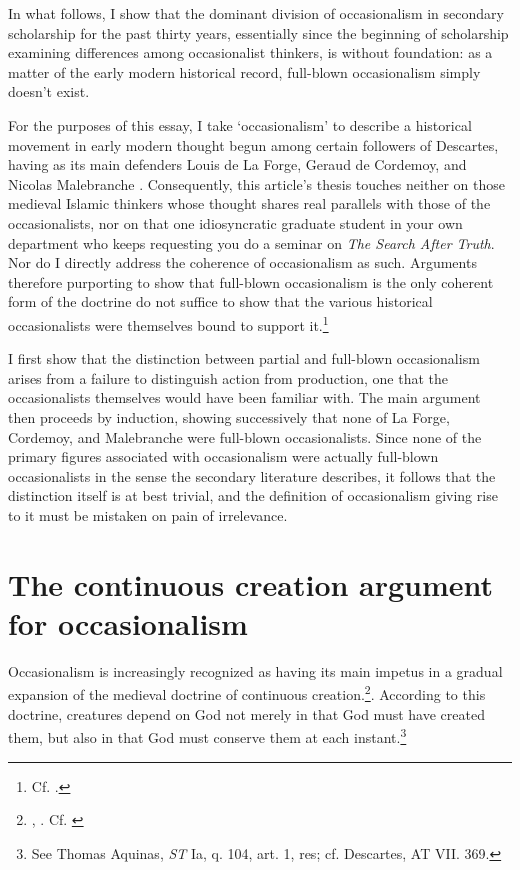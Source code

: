 In what follows, I show that the dominant division of occasionalism in secondary scholarship for the past thirty years, essentially since the beginning of scholarship examining differences among occasionalist thinkers, is without foundation: as a matter of the early modern historical record, full-blown occasionalism simply doesn't exist.

For the purposes of this essay, I take `occasionalism' to describe a historical movement in early modern thought begun among certain followers of Descartes, having as its main defenders Louis de La Forge, Geraud de Cordemoy, and Nicolas Malebranche \autocite[37]{Nadler2005}. Consequently, this article's thesis touches neither on those medieval Islamic thinkers whose thought shares real parallels with those of the occasionalists, nor on that one idiosyncratic graduate student in your own department who keeps requesting you do a seminar on \emph{The Search After Truth}. Nor do I directly address the coherence of occasionalism as such. Arguments therefore purporting to show that full-blown occasionalism is the only coherent form of the doctrine do not suffice to show that the various historical occasionalists were themselves bound to support it.\footnote{Cf. \autocite{Nadler1998,Winkler2011}.} 

I first show that the distinction between partial and full-blown occasionalism arises from a failure to distinguish action from production, one that the occasionalists themselves would have been familiar with. The main argument then proceeds by induction, showing successively that none of La Forge, Cordemoy, and Malebranche were full-blown occasionalists. Since none of the primary figures associated with occasionalism were actually full-blown occasionalists in the sense the secondary literature describes, it follows that the distinction itself is at best trivial, and the definition of occasionalism giving rise to it must be mistaken on pain of irrelevance.


\section{The continuous creation argument for occasionalism}
Occasionalism is increasingly recognized as having its main impetus in a gradual expansion of the medieval doctrine of continuous creation.\footnote{\autocite[63]{Nadler1993b}, \autocite[219]{Nadler1998}. Cf. \autocite[287]{Winkler2011}}. According to this doctrine, creatures depend on God not merely in that God must have created them, but also in that God must conserve them at each instant.\footnote{See Thomas Aquinas, \emph{ST} Ia, q. 104, art. 1, res; cf. Descartes, AT VII. 369.} 

